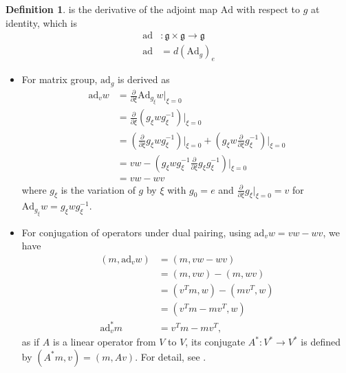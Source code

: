 \documentclass[a4paper]{article}
\theoremstyle{definition}
\newtheorem{definition}{Definition}
\theoremstyle{plain}
\begin{document}
\begin{definition}
 is the derivative of the adjoint map $\mathrm{Ad}$ with respect to $g$ at identity, which is
\begin{align*}
    \mathrm{ad}&:\mathfrak{g}\times\mathfrak{g}\rightarrow\mathfrak{g}\\
    \mathrm{ad}&=d(\mathrm{Ad}_g)_e
\end{align*}
\end{definition}

\begin{itemize}
    \item For matrix group, $\mathrm{ad}_g$ is derived as
    \begin{align*}
        \mathrm{ad}_vw&=\frac{\partial}{\partial\xi}\mathrm{Ad}_{g_\xi}w|_{\xi=0}\\
        &=\frac{\partial}{\partial\xi}(g_\xi wg_\xi^{-1})|_{\xi=0}\\
        &=\left(\frac{\partial}{\partial\xi}g_\xi wg_\xi^{-1}\right)\bigg\rvert_{\xi=0}+\left(g_\xi w\frac{\partial}{\partial\xi}g_\xi^{-1}\right)\bigg\rvert_{\xi=0}\\
        &=vw-\left(g_\xi wg_\xi^{-1}\frac{\partial}{\partial\xi}g_\xi g_\xi^{-1}\right)\bigg\rvert_{\xi=0}\\
        &=vw-wv
    \end{align*}
    where $g_\xi$ is the variation of $g$ by $\xi$ with $g_0=e$ and $\frac{\partial}{\partial \xi}g_\xi|_{\xi=0}=v$ for $\mathrm{Ad}_{g_\xi}w=g_\xi w g^{-1}_\xi$.
    
    \item For conjugation of operators under dual pairing, using $\mathrm{ad}_vw=vw-wv$, we have
    \begin{align*}
        (m,\mathrm{ad}_vw)&=(m,vw-wv)\\
        &=(m,vw)-(m,wv)\\
        &=(v^Tm,w)-(mv^T,w)\\
        &=(v^Tm-mv^T,w)\\
        \mathrm{ad}^*_vm&=v^Tm-mv^T,
    \end{align*}
    as if $A$ is a linear operator from $V$ to $V$, its conjugate $A^*:V^*\rightarrow V^*$ is defined by $(A^*m,v)=(m,Av)$. For detail, see  \cite{singh}.
    

\end{itemize}
\end{document}
